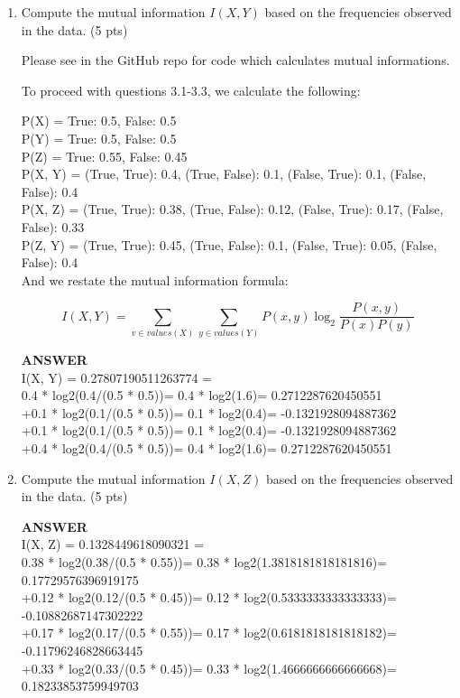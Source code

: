 \documentclass[a4paper]{article}
\theoremstyle{definition}
\begin{document}
\begin{enumerate}
	\item Compute the mutual information $I(X, Y)$ based on the frequencies observed in the data. (5 pts)

        Please see  in the GitHub repo for code which calculates mutual informations.

        To proceed with questions 3.1-3.3, we calculate the following:

        P(X) = {True: 0.5, False: 0.5}\\
        P(Y) = {True: 0.5, False: 0.5}\\
        P(Z) = {True: 0.55, False: 0.45}\\
        P(X, Y) = {(True, True): 0.4, (True, False): 0.1, (False, True): 0.1, (False, False): 0.4}\\
        P(X, Z) = {(True, True): 0.38, (True, False): 0.12, (False, True): 0.17, (False, False): 0.33}\\
        P(Z, Y) = {(True, True): 0.45, (True, False): 0.1, (False, True): 0.05, (False, False): 0.4}\\

        And we restate the mutual information formula:

        $$I(X,Y) = \sum_{v \in values(X)} \sum_{y \in values(Y)} P(x,y) \log_2{\frac{P(x,y)}{P(x)P(y)}}$$

        \textbf{ANSWER}\\
        I(X, Y) = 0.27807190511263774 = \\
        0.4 * log2(0.4/(0.5 * 0.5))= 0.4 * log2(1.6)= 0.2712287620450551\\
        +0.1 * log2(0.1/(0.5 * 0.5))= 0.1 * log2(0.4)= -0.1321928094887362\\
        +0.1 * log2(0.1/(0.5 * 0.5))= 0.1 * log2(0.4)= -0.1321928094887362\\
        +0.4 * log2(0.4/(0.5 * 0.5))= 0.4 * log2(1.6)= 0.2712287620450551\\
 
	\item Compute the mutual information $I(X, Z)$ based on the frequencies observed in the data. (5 pts)

        \textbf{ANSWER}\\
        I(X, Z) = 0.1328449618090321 = \\
        0.38 * log2(0.38/(0.5 * 0.55))= 0.38 * log2(1.3818181818181816)= 0.17729576396919175\\
        +0.12 * log2(0.12/(0.5 * 0.45))= 0.12 * log2(0.5333333333333333)= -0.10882687147302222\\
        +0.17 * log2(0.17/(0.5 * 0.55))= 0.17 * log2(0.6181818181818182)= -0.11796246828663445\\
        +0.33 * log2(0.33/(0.5 * 0.45))= 0.33 * log2(1.4666666666666668)= 0.18233853759949703\\
 

\end{enumerate}
\end{document}
